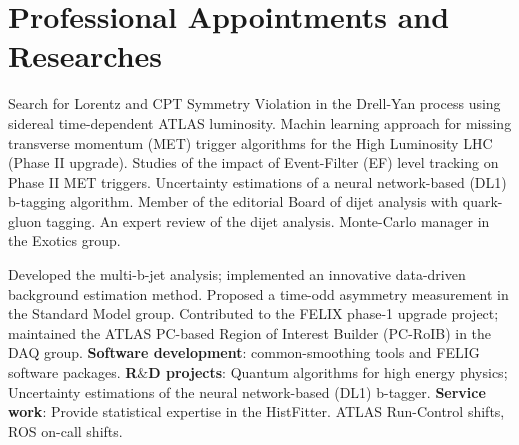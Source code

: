 \section{Professional Appointments and Researches}

\begin{cventries}
\end{cventries}
      \vspace{-1cm}
      \parbox{0.9\linewidth}{
      \leftskip=0.5in
       Search for Lorentz and  CPT Symmetry Violation in the Drell-Yan process using 
       sidereal time-dependent ATLAS luminosity. Machin learning approach for missing transverse momentum (MET) trigger algorithms for the High Luminosity LHC (Phase II upgrade). Studies of the impact of Event-Filter (EF) level tracking on Phase II MET triggers.\newline
        Uncertainty estimations of a neural network-based (DL1) b-tagging algorithm.\newline
        Member of the editorial Board of dijet analysis with quark-gluon tagging. 
        An expert review of the dijet analysis. \newline
        Monte-Carlo manager in the Exotics group.
        }
 
 \begin{cventries}   
  \end{cventries}
  \vspace{-1cm}
   \parbox{0.9\linewidth}{
      \leftskip=0.5in
       Developed the multi-b-jet analysis; implemented an innovative data-driven background
       estimation method. Proposed a time-odd asymmetry measurement in the Standard Model group. \newline
        Contributed to the FELIX phase-1 upgrade project; maintained the ATLAS PC-based Region of 
        Interest Builder (PC-RoIB) in the DAQ group. \newline
        \textbf{Software development}: common-smoothing tools and FELIG software packages. \newline
        \textbf{R$\&$D projects}: Quantum algorithms for high energy physics; Uncertainty estimations 
        of the neural network-based (DL1) b-tagger. \newline
        \textbf{Service work}: Provide statistical expertise in the HistFitter. ATLAS Run-Control shifts,
        ROS on-call shifts.
    }
    

